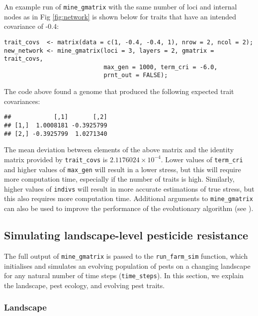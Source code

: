 \documentclass[10pt,letterpaper]{article}
\begin{document}
An example run of \texttt{mine\_gmatrix} with the same number of loci and internal nodes as in Fig \ref{fig:network} is shown below for traits that have an intended covariance of -0.4:

\begin{verbatim}
trait_covs  <- matrix(data = c(1, -0.4, -0.4, 1), nrow = 2, ncol = 2);
new_network <- mine_gmatrix(loci = 3, layers = 2, gmatrix = trait_covs, 
                            max_gen = 1000, term_cri = -6.0, 
                            prnt_out = FALSE);
\end{verbatim}


The code above found a genome that produced the following expected trait covariances:

\begin{verbatim}
##            [,1]       [,2]
## [1,]  1.0008181 -0.3925799
## [2,] -0.3925799  1.0271340
\end{verbatim}

The mean deviation between elements of the above matrix and the identity matrix provided by \texttt{trait\_covs} is \ensuremath{2.1176024\times 10^{-4}}.
Lower values of \texttt{term\_cri} and higher values of \texttt{max\_gen} will result in a lower stress, but this will require more computation time, especially if the number of traits is high.
Similarly, higher values of \texttt{indivs} will result in more accurate estimations of true stress, but this also requires more computation time.
Additional arguments to \texttt{mine\_gmatrix} can also be used to improve the performance of the evolutionary algorithm (see ).


\hypertarget{simulating}{%
\subsection{Simulating landscape-level pesticide resistance}\label{simulating}}

The full output of \texttt{mine\_gmatrix} is passed to the \texttt{run\_farm\_sim} function, which initialises and simulates an evolving population of pests on a changing landscape for any natural number of time steps (\texttt{time\_steps}).
In this section, we explain the landscape, pest ecology, and evolving pest traits.

\hypertarget{landscape}{%
\subsubsection{Landscape}\label{landscape}}
\end{document}
